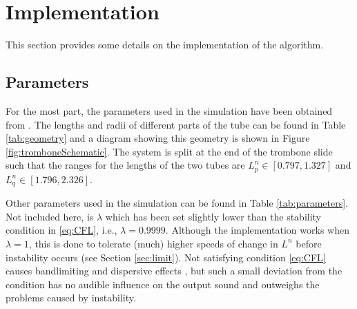 \section{Implementation}\label{sec:implementation}
This section provides some details on the implementation of the algorithm.

\subsection{Parameters}
For the most part, the parameters used in the simulation have been obtained from \cite{Harrison2018, Smyth2011, Benade1968}. The lengths and radii of different parts of the tube can be found in Table \ref{tab:geometry} and a diagram showing this geometry is shown in Figure \ref{fig:tromboneSchematic}.
The system is split at the end of the trombone slide such that the ranges for the lengths of the two tubes are $L_p^n \in[0.797, 1.327]$ and $L_q^n \in [1.796, 2.326]$.

Other parameters used in the simulation can be found in Table \ref{tab:parameters}. Not included here, is $\lambda$ which has been set slightly lower than the stability condition in \eqref{eq:CFL}, i.e., $\lambda = 0.9999$. Although the implementation works when $\lambda = 1$, this is done to tolerate (much) higher speeds of change in $L^n$ before instability occurs (see Section \ref{sec:limit}). Not satisfying condition \eqref{eq:CFL} causes bandlimiting and dispersive effects \cite{bilbao2009}, but such a small deviation from the condition has no audible influence on the output sound and outweighs the problems caused by instability.

